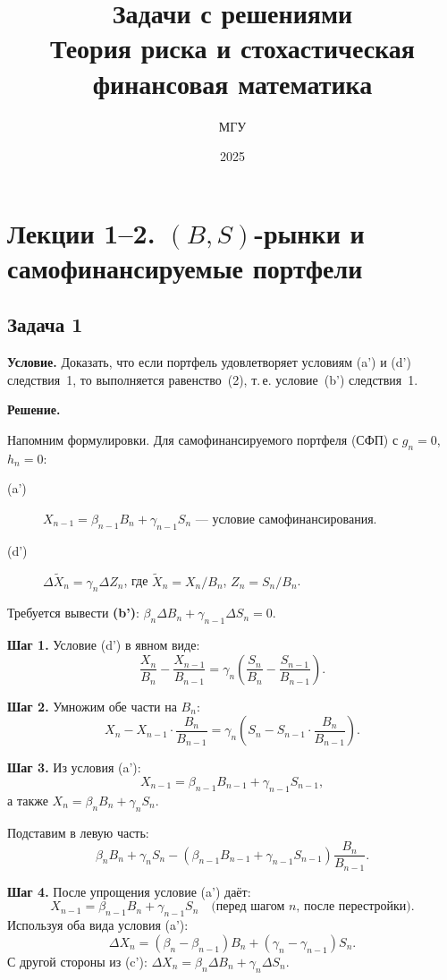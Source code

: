 \documentclass[12pt,a4paper]{article}
\title{Задачи с решениями\\[0.4em]
\large Теория риска и стохастическая финансовая математика}
\author{МГУ}
\date{2025}
\theoremstyle{zadacha}
\begin{document}
\maketitle
\tableofcontents
\newpage

\section{Лекции 1–2. $(B,S)$-рынки и самофинансируемые портфели}

\subsection*{Задача 1}

\textbf{Условие.} Доказать, что если портфель удовлетворяет условиям (a') и (d') следствия~1, то выполняется равенство~(2), т.\,е. условие~(b') следствия~1.

\medskip
\textbf{Решение.}

Напомним формулировки. Для самофинансируемого портфеля (СФП) с $g_n = 0$, $h_n = 0$:

\begin{description}
  \item[(a')] $X_{n-1} = \beta_{n-1} B_n + \gamma_{n-1} S_n$ --- условие самофинансирования.
  \item[(d')] $\Delta \tilde{X}_n = \gamma_n \Delta Z_n$, где $\tilde{X}_n = X_n/B_n$, $Z_n = S_n/B_n$.
\end{description}

Требуется вывести \textbf{(b')}: $\beta_n \Delta B_n + \gamma_{n-1} \Delta S_n = 0$.

\textbf{Шаг 1.} Условие (d') в явном виде:
\[
\frac{X_n}{B_n} - \frac{X_{n-1}}{B_{n-1}} = \gamma_n \!\left(\frac{S_n}{B_n} - \frac{S_{n-1}}{B_{n-1}}\right).
\]

\textbf{Шаг 2.} Умножим обе части на $B_n$:
\[
X_n - X_{n-1} \cdot \frac{B_n}{B_{n-1}} = \gamma_n \!\left(S_n - S_{n-1} \cdot \frac{B_n}{B_{n-1}}\right).
\]

\textbf{Шаг 3.} Из условия (a'):
\[
X_{n-1} = \beta_{n-1} B_{n-1} + \gamma_{n-1} S_{n-1},
\]
а также $X_n = \beta_n B_n + \gamma_n S_n$.

Подставим в левую часть:
\[
\beta_n B_n + \gamma_n S_n - (\beta_{n-1} B_{n-1} + \gamma_{n-1} S_{n-1}) \frac{B_n}{B_{n-1}}.
\]

\textbf{Шаг 4.} После упрощения условие (a') даёт:
\[
X_{n-1} = \beta_{n-1} B_n + \gamma_{n-1} S_n \quad \text{(перед шагом }n\text{, после перестройки)}.
\]
Используя оба вида условия (a'):
\[
\Delta X_n = (\beta_n - \beta_{n-1}) B_n + (\gamma_n - \gamma_{n-1}) S_n.
\]
С другой стороны из (c'): $\Delta X_n = \beta_n \Delta B_n + \gamma_n \Delta S_n$.
\end{document}
